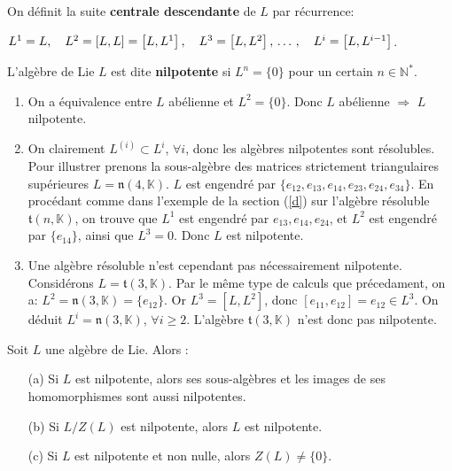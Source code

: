 \documentclass[a4paper,openany,12pt]{report}
\newcommand{\KK}{\mathbb{K}}
\newcommand{\NN}{\mathbb{N}}
\newcommand{\ttt}{\mathfrak{t}}
\newcommand{\nn}{\mathfrak{n}}
\theoremstyle{break}
{\theorembodyfont{\upshape}
\newtheorem*{rmq}{Remarque :}
\newtheorem*{prv}{Preuve :}
\newtheorem*{ex}{Exemples :}
\newtheorem*{exe}{Exemple : }
\newtheorem*{nota}{Notation :}
\newtheorem*{dem}{D\'emonstration :}}
\begin{document}
On définit la suite \textbf{centrale descendante} de $L$ par récurrence:
\begin{center}
$L^{1}=L, \quad L^{2}=[L, L]=\left[L, L^{1}\right], \quad L^{3}=\left[L, L^{2}\right], \thinspace \ldots \thinspace, \quad L^{i}=\left[L, L^{i-1}\right]$.
\end{center}

\begin{df}
\quad L'algèbre de Lie $L$ est dite \textbf{nilpotente} si $L^{n} = \{0\}$ pour un certain $n \in \NN^{*}$.
\end{df}

\begin{ex}
\begin{enumerate}
\item On a équivalence entre $L$ abélienne et $L^{2}= \{ 0 \}$. Donc $L$ abélienne $\Rightarrow$ $L$ nilpotente.

\item On clairement $L^{(i)} \subset L^{i}$, $\forall i$, donc les algèbres nilpotentes sont résolubles. Pour illustrer prenons la sous-algèbre des matrices strictement triangulaires supérieures $L = \nn(4,\KK)$. $L$ est engendré par $\{e_{12},e_{13},e_{14},e_{23},e_{24},e_{34}\}$. En procédant comme dans l'exemple de la section (\ref{d}) sur l'algèbre résoluble $\ttt(n, \KK)$, on trouve que $L^{1}$ est engendré par ${e_{13},e_{14},e_{24}}$, et $L^{2}$ est engendré par $\{e_{14}\}$, ainsi que $ L^{3}=0 $. Donc $L$ est nilpotente.
 
\item Une algèbre résoluble n'est cependant pas nécessairement nilpotente. Considérons $L = \ttt(3,\KK)$. Par le même type de calculs que précedament, on a: $L^2 = \nn(3, \KK) = \{ e_{12} \}$. Or $L^3 = [L,L^2]$, donc $[e_{11},e_{12}] = e_{12} \in L^3$. On déduit $L^i = \nn(3, \KK)$, $\forall i \geq 2$. L'algèbre $\ttt(3, \KK)$ n'est donc pas nilpotente.
\end{enumerate} 
\end{ex}

\begin{prop}\label{prop:nilp}
\quad Soit $L$ une algèbre de Lie. Alors :
\begin{itemize}
\item[(a)] Si $L$ est nilpotente, alors ses sous-algèbres et les images de ses homomorphismes sont aussi nilpotentes.

\item[(b)]  Si $L/Z(L)$ est nilpotente, alors $L$ est nilpotente.

\item[(c)] Si $L$ est nilpotente et non nulle, alors $Z(L) \ne \{0\}$.
\end{itemize}
\end{prop}
\end{document}
